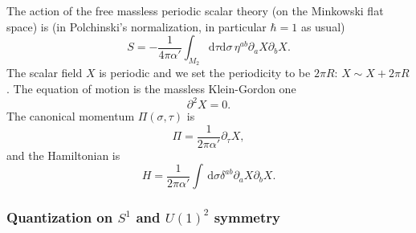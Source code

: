 \documentclass[
]{scrartcl}
\numberwithin{equation}{section}
\theoremstyle{definition}
\theoremstyle{definition}
\theoremstyle{definition}
\theoremstyle{definition}
\theoremstyle{remark}
\begin{document}
The action of the free massless periodic scalar theory (on the Minkowski flat space) is (in Polchinski's normalization, in particular \(\hbar =1\) as usual)
\begin{equation}
    \label{eq:SX}
    S = -\frac{1}{4\pi\alpha'}\int_{M_2} \mathrm{d}\tau\mathrm{d}\sigma \,\eta^{ab}\partial_a X \partial_b X.
\end{equation}
The scalar field \(X\) is periodic and we set the periodicity to be \(2\pi R\): \(X \sim X + 2\pi R\).
The equation of motion is the massless Klein-Gordon one
\begin{equation}
    \label{eq:EOMX}
    \partial^2 X = 0.
\end{equation}
The canonical momentum \(\Pi(\sigma,\tau)\) is
\begin{equation}
    \label{eq:momentum}
    \Pi = \frac{1}{2\pi \alpha'} \partial_\tau X,
\end{equation}
and the Hamiltonian is
\begin{equation}
    \label{eq:HamX}
    H = \frac{1}{2\pi\alpha'}\int\, \mathrm{d}\sigma \delta^{ab}\partial_a X \partial_b X.
\end{equation}

\hypertarget{quantization-on-s1-and-u12-symmetry}{%
\subsubsection{\texorpdfstring{Quantization on \(S^1\) and \(U(1)^2\) symmetry}{Quantization on S\^{}1 and U(1)\^{}2 symmetry}}\label{quantization-on-s1-and-u12-symmetry}}
\end{document}
